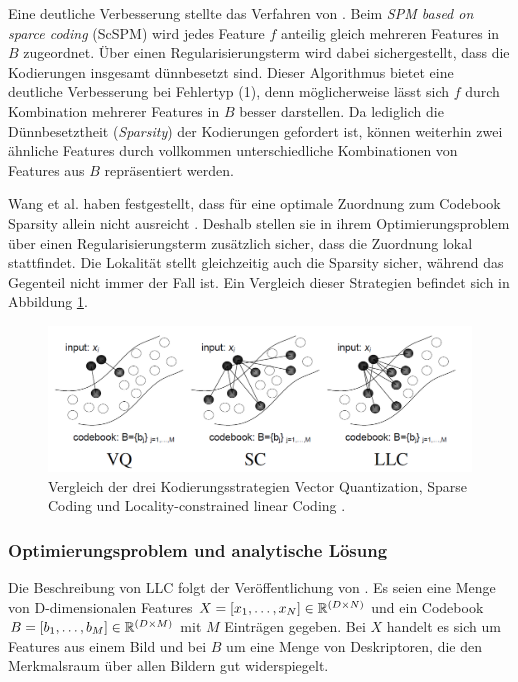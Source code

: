 Eine deutliche Verbesserung stellte das Verfahren von \cite{yygh09}. Beim \emph{SPM based on sparce coding} (ScSPM) wird jedes Feature $f$ anteilig gleich mehreren Features in $B$ zugeordnet. Über einen Regularisierungsterm wird dabei sichergestellt, dass die Kodierungen insgesamt dünnbesetzt sind. Dieser Algorithmus bietet eine deutliche Verbesserung bei Fehlertyp (1), denn möglicherweise lässt sich $f$ durch Kombination mehrerer Features in $B$ besser darstellen. Da lediglich die Dünnbesetztheit (\emph{Sparsity}) der Kodierungen gefordert ist, können weiterhin zwei ähnliche Features durch vollkommen unterschiedliche Kombinationen von Features aus $B$ repräsentiert werden.

Wang et al. haben festgestellt, dass für eine optimale Zuordnung zum Codebook Sparsity allein nicht ausreicht \cite{wyylhg10}. Deshalb stellen sie in ihrem Optimierungsproblem über einen Regularisierungsterm zusätzlich sicher, dass die Zuordnung lokal stattfindet. Die Lokalität stellt gleichzeitig auch die Sparsity sicher, während das Gegenteil nicht immer der Fall ist. Ein Vergleich dieser Strategien befindet sich in Abbildung \ref{img:quant_comp}.

\begin{figure}
	\centering
	\includegraphics[scale=0.5]{img/quant_comp.png}
	\caption{Vergleich der drei Kodierungsstrategien Vector Quantization, Sparse Coding und Locality-constrained linear Coding \cite{wyylhg10}.}
	\label{img:quant_comp}
\end{figure}

\subsubsection{Optimierungsproblem und analytische Lösung}

Die Beschreibung von LLC folgt der Veröffentlichung von \cite{wyylhg10}. Es seien eine Menge von D-dimensionalen Features $X = [x_1, \dots, x_N] \in \mathbb{R}^{(D \times N)}$ und ein Codebook $B = [b_1, \dots, b_M] \in \mathbb{R}^{(D \times M)}$ mit $M$ Einträgen gegeben. Bei $X$ handelt es sich um Features aus einem Bild und bei $B$ um eine Menge von Deskriptoren, die den Merkmalsraum über allen Bildern gut widerspiegelt.
 
